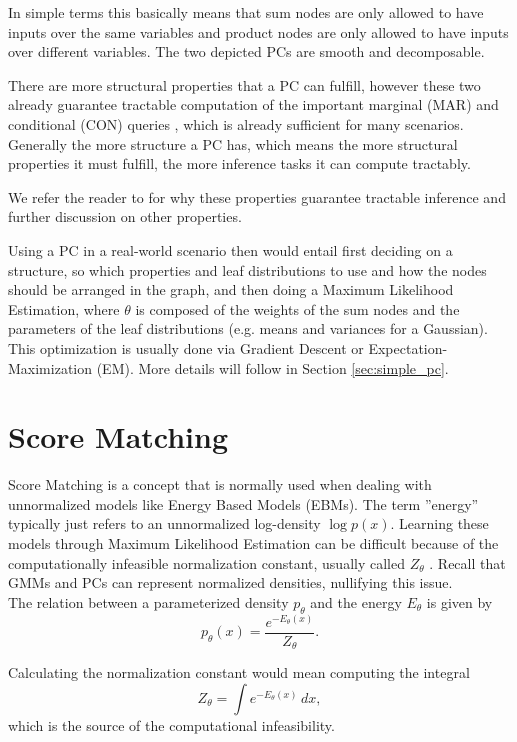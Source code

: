In simple terms this basically means that sum nodes are only allowed to have inputs over the same variables and product nodes are
only allowed to have inputs over different variables. The two depicted PCs are smooth and decomposable.

There are more structural properties that a PC can fulfill, however these two already guarantee tractable computation of the important
marginal (MAR) and conditional (CON) queries \cite{pc_intro}, which is already sufficient for many scenarios. 
Generally the more structure a PC has, which means the more structural properties it must fulfill, the more inference tasks it can compute 
tractably. 

We refer the reader to \cite{pc_intro} for why these properties guarantee tractable inference 
and further discussion on other properties.

Using a PC in a real-world scenario then would entail first deciding on a structure, so which properties and leaf 
distributions to use and how the nodes should be arranged in the graph, and then doing a Maximum Likelihood 
Estimation, where $\theta$ is composed of the weights of the sum nodes and the parameters of the leaf distributions (e.g. means and variances for a Gaussian). 
This optimization is usually done via Gradient Descent or Expectation-Maximization (EM). More details will follow in Section \ref{sec:simple_pc}.

\section{Score Matching}
\label{sec:sm}

Score Matching \cite{sm} is a concept that is normally used when dealing with unnormalized models like Energy Based Models (EBMs). The term 
''energy'' typically just refers to an unnormalized log-density $\log p(x)$. 
Learning these models through Maximum Likelihood Estimation can be difficult because of the computationally infeasible normalization 
constant, usually called $Z_\theta$ \cite{sm}. Recall that GMMs and PCs can represent normalized densities, nullifying this issue. \\

The relation between a parameterized density $p_\theta$ and the energy $E_\theta$ is given by
\[
    p_\theta(x) = \frac{e^{-E_\theta(x)}}{Z_\theta}.
\]

Calculating the normalization constant would mean computing the integral 
\[
    Z_\theta = \int e^{-E_\theta(x)} \, dx, 
\]
which is the source of the computational infeasibility. \\


